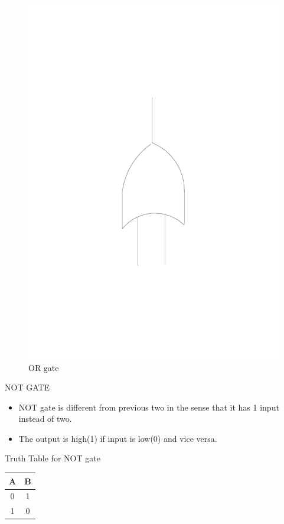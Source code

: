 \documentclass{beamer}
\begin{document}
\begin{frame}
\begin{figure}
\includegraphics[scale=0.2]{../beamer_bib/or} 
\caption{OR gate}
\end{figure}
\end{frame}
\begin{frame}[label=NOT]{NOT GATE}
\begin{block}{}
\begin{itemize}
  \item NOT gate is different from previous two in the sense that it has 1 input instead of two.
  \item The output is high(1) if input is low(0) and vice versa.
  
\end{itemize}
\end{block}
\medskip
\medskip
\pause
\begin{block}{Truth Table for NOT gate}
\begin{tabular}{|c|c|}
\hline
 \textbf{A} &
\textbf{B} \\
\hline
\hline
 0 & 1 \\
\hline
 1 & 0 \\
\hline
\end{tabular}
\end{block}
\end{frame}
\end{document}
